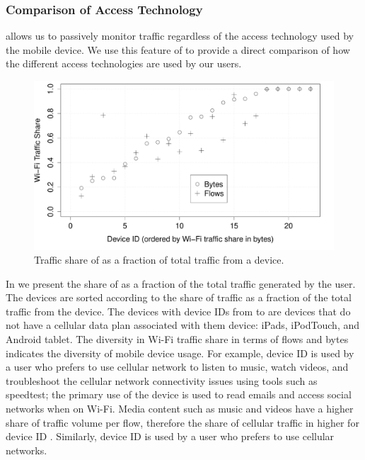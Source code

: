 \subsubsection{Comparison of Access Technology}
\platname allows us to passively monitor traffic regardless of the access technology used by the mobile device. 
We use this feature of \platname to provide a direct comparison of how the different access technologies are used by our users. 



\begin{figure}
\includegraphics[width=\columnwidth]{plots/deviceTechShare.pdf}
\caption{Traffic share of \wifi as a fraction of total traffic from a device. }
\label{fig:devicetechshare}
\end{figure}

In  we present the share of \wifi as a fraction of the total traffic generated by the user.
The devices are sorted according to the share of \wifi traffic as a fraction of the total traffic from the device.  
The devices with device IDs from  to  are devices that do not have a cellular data plan associated with them device:  iPads,  iPodTouch, and  Android tablet.
The diversity in Wi-Fi traffic share in terms of flows and bytes indicates the diversity of mobile device usage. 
For example, device ID  is used by a user who prefers to use cellular network to listen to music, watch videos, and troubleshoot the cellular network connectivity issues using tools such as speedtest; the primary use of the device is used to read emails and access social networks when on Wi-Fi. 
Media content such as music and videos have a higher share of traffic volume per flow, therefore the share of cellular traffic in higher for device ID . 
Similarly, device ID  is used by a user who prefers to use cellular networks. 

